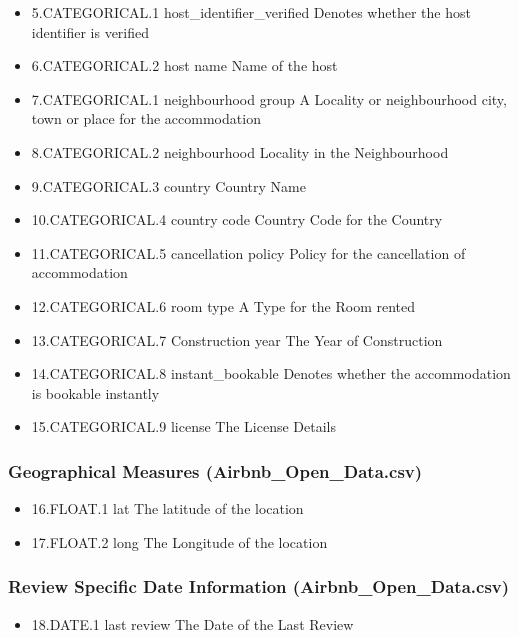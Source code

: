 \documentclass[11pt]{article}
\providecommand{\tightlist}{%
      \setlength{\itemsep}{0pt}\setlength{\parskip}{0pt}}
\begin{document}
\begin{itemize}
\tightlist
\item
  5.CATEGORICAL.1 host\_identifier\_verified Denotes whether the host
  identifier is verified
\item
  6.CATEGORICAL.2 host name Name of the host
\item
  7.CATEGORICAL.1 neighbourhood group A Locality or neighbourhood city,
  town or place for the accommodation
\item
  8.CATEGORICAL.2 neighbourhood Locality in the Neighbourhood
\item
  9.CATEGORICAL.3 country Country Name
\item
  10.CATEGORICAL.4 country code Country Code for the Country
\item
  11.CATEGORICAL.5 cancellation policy Policy for the cancellation of
  accommodation
\item
  12.CATEGORICAL.6 room type A Type for the Room rented
\item
  13.CATEGORICAL.7 Construction year The Year of Construction
\item
  14.CATEGORICAL.8 instant\_bookable Denotes whether the accommodation
  is bookable instantly
\item
  15.CATEGORICAL.9 license The License Details
\end{itemize}

\hypertarget{geographical-measures-airbnb_open_data.csv}{%
\subsubsection{Geographical Measures
(Airbnb\_Open\_Data.csv)}\label{geographical-measures-airbnb_open_data.csv}}

\begin{itemize}
\tightlist
\item
  16.FLOAT.1 lat The latitude of the location
\item
  17.FLOAT.2 long The Longitude of the location
\end{itemize}

\hypertarget{review-specific-date-information-airbnb_open_data.csv}{%
\subsubsection{Review Specific Date Information
(Airbnb\_Open\_Data.csv)}\label{review-specific-date-information-airbnb_open_data.csv}}

\begin{itemize}
\tightlist
\item
  18.DATE.1 last review The Date of the Last Review
\end{itemize}
\end{document}
